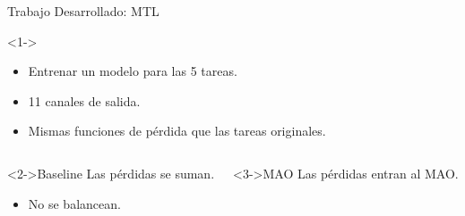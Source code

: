\documentclass[xcolor=dvipsnames,table]{beamer}
\begin{document}
\begin{frame}{Trabajo Desarrollado: MTL}
	\begin{block}<1->{}
		\begin{itemize}
			\item Entrenar un modelo para las 5 tareas.
			\item 11 canales de salida.
			\item Mismas funciones de pérdida que las tareas originales.
		\end{itemize}
	\end{block}
	
	\vspace{-0.5cm}
	
	\begin{columns}[T,onlytextwidth]
		\begin{block}<2->{Baseline}
			Las pérdidas se suman.
			\begin{itemize}
				\item No se balancean.
			\end{itemize}
			
		\end{block}
		\centering
		
		\begin{block}<3->{MAO}
			Las pérdidas entran al MAO.
		\end{block}
		\centering
	\end{columns}
\end{frame}
\end{document}
